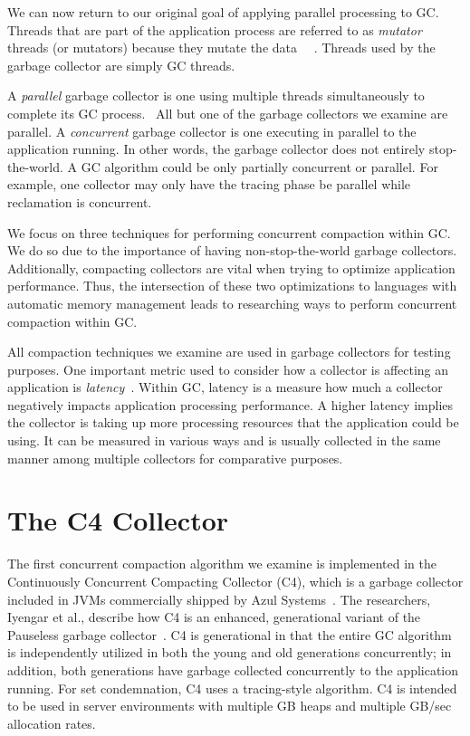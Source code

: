 \documentclass{sig-alternate}
\begin{document}
We can now return to our original goal of applying parallel processing to GC.
Threads that are part of the application process are referred to as \emph{mutator}
threads (or mutators) because they mutate the data~\cite{Tene:C4}~\cite{Iyengar:Collie}
\cite{Osterlund:FPP}. Threads used by the garbage collector are simply GC threads.

A \emph{parallel} garbage collector is one using
multiple threads simultaneously to complete its GC process.~\cite{Puffitsch:background}
All but one of the garbage collectors we examine are parallel. A \emph{concurrent} garbage
collector is one executing in parallel to the application running. In other 
words, the garbage collector does not entirely stop-the-world. A GC algorithm
could be only partially concurrent or parallel. For example, one collector may
only have the tracing phase be parallel while reclamation is concurrent.

We focus on three techniques for performing
concurrent compaction within GC. We do so due to the importance 
of having non-stop-the-world garbage collectors. Additionally, compacting
collectors are vital when trying to optimize application performance. Thus,
the intersection of these two optimizations to languages with automatic memory management leads
to researching ways to perform concurrent compaction within GC.

All compaction techniques we examine are used in garbage
collectors for testing purposes. One important metric used to consider
how a collector is affecting an application is \emph{latency}~\cite{Lindblom:2011}.
Within GC, latency is a measure how much a collector negatively impacts
application processing performance. A higher latency implies the collector
is taking up more processing resources that the application could be using. It 
can be measured in various ways and is usually collected in the same manner
among multiple collectors for comparative purposes.


\section{The C4 Collector}
\label{sec:c4}

The first concurrent compaction algorithm we examine is implemented in the 
Continuously Concurrent Compacting Collector (C4), which is a garbage collector 
included in JVMs commercially shipped by Azul Systems~\cite{Tene:C4}. The 
researchers, Iyengar et al., describe how C4 is an enhanced, generational variant
of the Pauseless garbage collector~\cite{Click:Pauseless}. C4 is generational in 
that the entire GC algorithm is independently utilized in both the young and old generations 
concurrently; in addition, both generations have garbage collected concurrently 
to the application running. For set condemnation, C4 uses a tracing-style algorithm.
C4 is intended to be used in server environments with multiple GB heaps and 
multiple GB/sec allocation rates.
\end{document}
